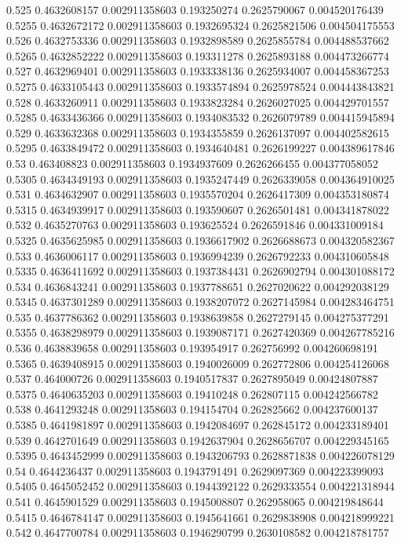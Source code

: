 {0.525 0.4632608157 0.002911358603 0.193250274 0.2625790067 0.004520176439
0.5255 0.4632672172 0.002911358603 0.1932695324 0.2625821506 0.004504175553
0.526 0.4632753336 0.002911358603 0.1932898589 0.2625855784 0.004488537662
0.5265 0.4632852222 0.002911358603 0.193311278 0.2625893188 0.004473266774
0.527 0.4632969401 0.002911358603 0.1933338136 0.2625934007 0.004458367253
0.5275 0.4633105443 0.002911358603 0.1933574894 0.2625978524 0.004443843821
0.528 0.4633260911 0.002911358603 0.1933823284 0.2626027025 0.004429701557
0.5285 0.4633436366 0.002911358603 0.1934083532 0.2626079789 0.004415945894
0.529 0.4633632368 0.002911358603 0.1934355859 0.2626137097 0.004402582615
0.5295 0.4633849472 0.002911358603 0.1934640481 0.2626199227 0.004389617846
0.53 0.463408823 0.002911358603 0.1934937609 0.2626266455 0.004377058052
0.5305 0.4634349193 0.002911358603 0.1935247449 0.2626339058 0.004364910025
0.531 0.4634632907 0.002911358603 0.1935570204 0.2626417309 0.004353180874
0.5315 0.4634939917 0.002911358603 0.193590607 0.2626501481 0.004341878022
0.532 0.4635270763 0.002911358603 0.193625524 0.2626591846 0.004331009184
0.5325 0.4635625985 0.002911358603 0.1936617902 0.2626688673 0.004320582367
0.533 0.4636006117 0.002911358603 0.1936994239 0.2626792233 0.004310605848
0.5335 0.4636411692 0.002911358603 0.1937384431 0.2626902794 0.004301088172
0.534 0.4636843241 0.002911358603 0.1937788651 0.2627020622 0.004292038129
0.5345 0.4637301289 0.002911358603 0.1938207072 0.2627145984 0.004283464751
0.535 0.4637786362 0.002911358603 0.1938639858 0.2627279145 0.004275377291
0.5355 0.4638298979 0.002911358603 0.1939087171 0.2627420369 0.004267785216
0.536 0.4638839658 0.002911358603 0.193954917 0.262756992 0.004260698191
0.5365 0.4639408915 0.002911358603 0.1940026009 0.262772806 0.004254126068
0.537 0.464000726 0.002911358603 0.1940517837 0.2627895049 0.00424807887
0.5375 0.4640635203 0.002911358603 0.19410248 0.262807115 0.004242566782
0.538 0.4641293248 0.002911358603 0.194154704 0.262825662 0.004237600137
0.5385 0.4641981897 0.002911358603 0.1942084697 0.262845172 0.004233189401
0.539 0.4642701649 0.002911358603 0.1942637904 0.2628656707 0.004229345165
0.5395 0.4643452999 0.002911358603 0.1943206793 0.2628871838 0.004226078129
0.54 0.4644236437 0.002911358603 0.1943791491 0.2629097369 0.004223399093
0.5405 0.4645052452 0.002911358603 0.1944392122 0.2629333554 0.004221318944
0.541 0.4645901529 0.002911358603 0.1945008807 0.262958065 0.004219848644
0.5415 0.4646784147 0.002911358603 0.1945641661 0.2629838908 0.004218999221
0.542 0.4647700784 0.002911358603 0.1946290799 0.2630108582 0.004218781757
}
